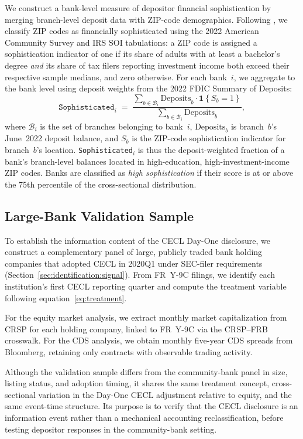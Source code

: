 We construct a bank-level measure of depositor financial sophistication by
merging branch-level deposit data with ZIP-code demographics. Following
\citet{narayanan2026decline}, we classify ZIP codes as financially sophisticated
using the 2022 American Community Survey and IRS SOI tabulations: a ZIP code is
assigned a sophistication indicator of one if its share of adults with at least a
bachelor's degree \textit{and} its share of tax filers reporting investment
income both exceed their respective sample medians, and zero otherwise.
For each bank~$i$, we aggregate to the bank level using deposit weights from the
2022 FDIC Summary of Deposits:
\begin{equation}
  \texttt{Sophisticated}_{i}
  \;=\;
  \frac{
    \displaystyle\sum_{b \in \mathcal{B}_i}
      \mathrm{Deposits}_{b} \cdot \mathbf{1}\!\left\{S_{b} = 1\right\}
  }{
    \displaystyle\sum_{b \in \mathcal{B}_i} \mathrm{Deposits}_{b}
  },
  \label{eq:sophistication}
\end{equation}
where $\mathcal{B}_i$ is the set of branches belonging to bank~$i$,
$\mathrm{Deposits}_b$ is branch~$b$'s June~2022 deposit balance, and $S_b$ is
the ZIP-code sophistication indicator for branch~$b$'s location.
\texttt{Sophisticated}$_i$ is thus the deposit-weighted fraction of a bank's branch-level
balances located in high-education, high-investment-income ZIP codes. Banks are
classified as \emph{high sophistication} if their score is at or above the 75th
percentile of the cross-sectional distribution.

\subsection{Large-Bank Validation Sample}
\label{sec:data:validation}

To establish the information content of the CECL Day-One disclosure, we
construct a complementary panel of large, publicly traded bank holding companies
that adopted CECL in 2020Q1 under SEC-filer requirements
(Section~\ref{sec:identification:signal}). From FR~Y-9C filings, we identify
each institution's first CECL reporting quarter and compute the treatment
variable following equation~\eqref{eq:treatment}.

For the equity market analysis, we extract monthly market capitalization from
CRSP for each holding company, linked to FR~Y-9C via the CRSP--FRB crosswalk.
For the CDS analysis, we obtain monthly five-year CDS spreads from Bloomberg,
retaining only contracts with observable trading activity.

Although the validation sample differs from the community-bank panel in size,
listing status, and adoption timing, it shares the same treatment concept,
cross-sectional variation in the Day-One CECL adjustment relative to equity,
and the same event-time structure. Its purpose is to verify that the CECL
disclosure is an information event rather than a mechanical accounting
reclassification, before testing depositor responses in the community-bank
setting.
